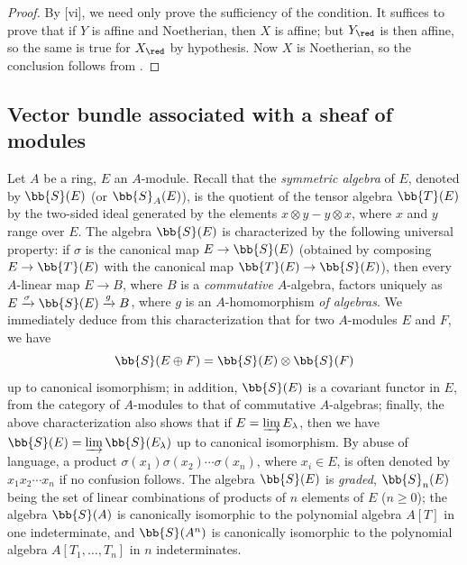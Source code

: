 \begin{proof}
By [vi], we need only prove the sufficiency of the condition.
It suffices to prove that if $Y$ is affine and Noetherian, then $X$ is affine; but $Y_\red$ is then affine, so the same is true for $X_\red$ by hypothesis.
Now $X$ is Noetherian, so the conclusion follows from .
\end{proof}

\subsection{Vector bundle associated with a sheaf of modules}
\label{subsection:II.1.7}

\begin{env}[1.7.1]
\label{II.1.7.1}
Let $A$ be a ring, $E$ an $A$-module.
Recall that the \emph{symmetric algebra} of $E$, denoted by $\bb{S}(E)$ (or $\bb{S}_A(E)$), is the quotient of the tensor algebra $\bb{T}(E)$ by the two-sided ideal generated by the elements $x\otimes y-y\otimes x$, where $x$ and $y$ range over $E$.
The algebra $\bb{S}(E)$ is characterized by the following universal property: if $\sigma$ is the canonical map $E\to\bb{S}(E)$ (obtained by composing $E\to\bb{T}(E)$ with the canonical map $\bb{T}(E)\to\bb{S}(E)$), then every $A$-linear map $E\to B$, where $B$ is a \emph{commutative} $A$-algebra, factors uniquely as $E\xrightarrow{\sigma}\bb{S}(E)\xrightarrow{g}B$, where $g$ is an $A$-homomorphism \emph{of algebras}.
We immediately deduce from this characterization that for two $A$-modules $E$ and $F$, we have
\[
  \bb{S}(E\oplus F)=\bb{S}(E)\otimes\bb{S}(F)
\]
up to canonical isomorphism; in addition, $\bb{S}(E)$ is a covariant functor in $E$, from the category of $A$-modules to that of commutative $A$-algebras; finally, the above characterization also shows that if $E=\varinjlim E_\lambda$, then we have $\bb{S}(E)=\varinjlim\bb{S}(E_\lambda)$ up to canonical isomorphism.
By abuse of language, a product $\sigma(x_1)\sigma(x_2)\cdots\sigma(x_n)$, where $x_i\in E$, is often denoted by $x_1 x_2\cdots x_n$ if no confusion follows.
The algebra $\bb{S}(E)$ is \emph{graded}, $\bb{S}_n(E)$ being the set of linear combinations of products of $n$ elements of $E$ ($n\geq 0$); the algebra $\bb{S}(A)$ is canonically isomorphic to the polynomial algebra $A[T]$ in one indeterminate, and $\bb{S}(A^n)$ is canonically isomorphic to the polynomial algebra $A[T_1,\dots,T_n]$ in $n$ indeterminates.
\end{env}

